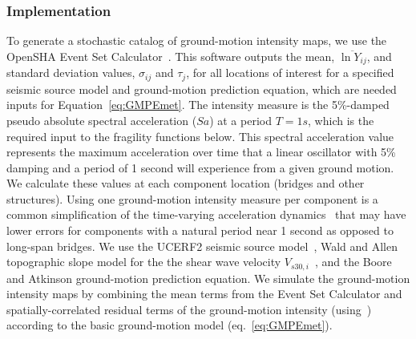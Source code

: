 \subsubsection{Implementation}
To generate a stochastic catalog of ground-motion intensity maps, we use the OpenSHA Event Set Calculator~\cite{field_opensha:_2003}. This software outputs the mean, $\overline{\ln Y_{ij}}$, and standard deviation values, $\sigma_{ij}$ and $\tau_j$, for all locations of interest for a specified seismic source model and ground-motion prediction equation, which are needed inputs for Equation~\ref{eq:GMPEmet}. The intensity measure is the 5\%-damped pseudo absolute  spectral acceleration ($Sa$) at a period $T=1s$, which is the required input to the fragility functions below. This spectral acceleration value represents the maximum acceleration over time  that a linear oscillator with 5\% damping and a period of 1 second will experience from a given ground motion. We calculate these values at each component location (bridges and other structures). Using one ground-motion intensity measure per component is a common simplification of the time-varying acceleration dynamics~\cite[e.g.,][]{shinozuka_effect_2003,jayaram_efficient_2010} that may have lower errors for components with a natural period near 1 second as opposed to long-span bridges.
We use the UCERF2 seismic source model~\cite{field_uniform_2009}, Wald and Allen topographic slope model for the the shear wave velocity $V_{s30,i}$~\cite{wald_topographic_2007}, and the Boore and Atkinson \cite{boore_ground-motion_2008} ground-motion prediction equation.   
We simulate the ground-motion intensity maps by combining the mean terms from the Event Set Calculator and spatially-correlated residual terms of the ground-motion intensity  (using~\cite{jayaram_correlation_2009}) according to the basic ground-motion model  (eq.~\ref{eq:GMPEmet}). 




